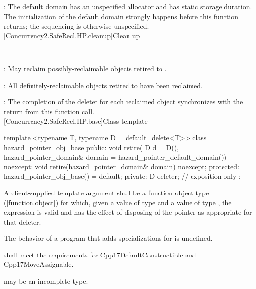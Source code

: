 \pnum
{}: The default domain has an unspecified allocator and has static storage
duration. The initialization of the default domain strongly happens before this function
returns; the sequencing is otherwise unspecified.
\\

[Concurrency2.SafeRecl.HP.cleanup]{Clean up}

\\
\hspace*{1.1em}

\pnum
{}: May reclaim possibly-reclaimable objects retired to .

\pnum
{}: All definitely-reclaimable objects retired to  have been reclaimed.

\pnum
{}: The completion of the deleter for each reclaimed object synchronizes
with the return from this function call.
\\

[Concurrency2.SafeRecl.HP.base]{Class template }

\begin{codeblock}
template <typename T, typename D = default_delete<T>>
class hazard_pointer_obj_base {
public:
  void retire(
    D d = D(),
    hazard_pointer_domain& domain = hazard_pointer_default_domain()) noexcept;
  void retire(hazard_pointer_domain& domain) noexcept;
protected:
  hazard_pointer_obj_base() = default;
private:
  D deleter; // exposition only
};
\end{codeblock}

\pnum
A client-supplied template argument  shall be a function object type ([function.object])
for which, given a value  of type  and a value  of type , the expression  is valid and has the effect of disposing of the pointer as appropriate for that deleter.

\pnum
The behavior of a program that adds specializations for  is undefined.

\pnum
{} shall meet the requirements for Cpp17DefaultConstructible and Cpp17MoveAssignable.

\pnum
{} may be an incomplete type.
\\

\\
\hspace*{1.1em}\\
\hspace*{1.1em}

